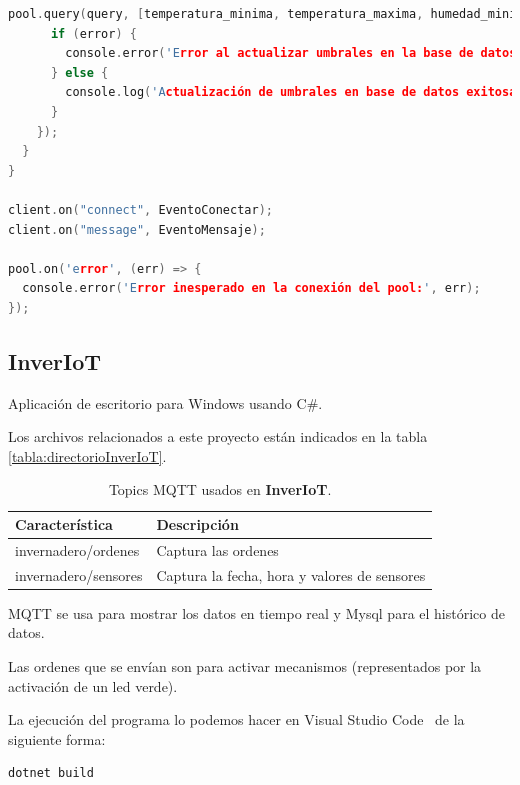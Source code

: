 \begin{lstlisting}[language=cpp, firstnumber=0, basicstyle=\normalsize, caption={Contenido de index.js.}]
    pool.query(query, [temperatura_minima, temperatura_maxima, humedad_minima, humedad_maxima, luminosidad_minima, luminosidad_maxima, humedad_suelo_minima, humedad_suelo_maxima], (error) => {
      if (error) {
        console.error('Error al actualizar umbrales en la base de datos:', error);
      } else {
        console.log('Actualización de umbrales en base de datos exitosa');
      }
    });
  }
}

client.on("connect", EventoConectar);
client.on("message", EventoMensaje);

pool.on('error', (err) => {
  console.error('Error inesperado en la conexión del pool:', err);
});
\end{lstlisting}

\subsection{InverIoT}
Aplicación de escritorio para Windows usando C\#.

Los archivos relacionados a este proyecto están indicados en la tabla \ref{tabla:directorioInverIoT}.

\begin{table}[htbp]
\begin{center}
\caption{Topics MQTT usados en \textbf{InverIoT}.}
\begin{tabular}{|l|l|}
\hline
\rowcolor[HTML]{C0C0C0} 
\textbf{Característica} & \textbf{Descripción}\\ \hline
invernadero/ordenes & Captura las ordenes\\ \hline
invernadero/sensores &  Captura la fecha, hora y valores de sensores\\ \hline
\end{tabular}
\end{center}
\end{table}

MQTT se usa para mostrar los datos en tiempo real y Mysql para el histórico de datos.

Las ordenes que se envían son para activar mecanismos (representados por la activación de un led verde).

La ejecución del programa lo podemos hacer en Visual Studio Code~\cite{misc:vscode} de la siguiente forma:

\begin{lstlisting}[language=sh, firstnumber=0, basicstyle=\normalsize, caption={Ejecutar proyecto InverIoT.}] 
dotnet build\end{lstlisting}

